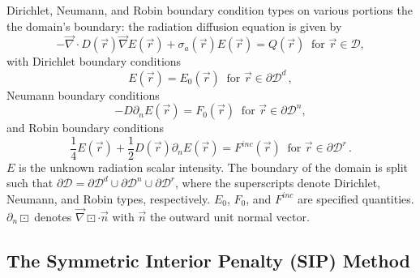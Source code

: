 \documentclass[preprint,10pt]{elsarticle}
\renewcommand{\div}{\vec{\nabla}\! \cdot \!}
\newcommand{\grad}{\vec{\nabla}}
\newcommand{\D}{\mathcal{D}}
\newcommand{\vr}{\vec{r}}
\newcommand{\vn}{\vec{n}}
\begin{document}
Dirichlet, Neumann, and Robin boundary condition types on various portions the the domain's
boundary: the radiation diffusion equation is given by
\begin{equation}
  -\div D(\vr) \grad E(\vr) + \sigma_a(\vr) E(\vr) = Q(\vr)\ \textrm{ for } \vr \in \D,
\end{equation}
with Dirichlet boundary conditions
\begin{equation}
  E(\vr)  = E_0(\vr)\ \textrm{ for } \vr \in  \partial \D^d \, ,
\end{equation}
Neumann boundary conditions
\begin{equation}
  -D \partial_n E(\vr) = F_0(\vr) \ \textrm{ for } \vr \in \partial \D^n,
\end{equation}
and Robin boundary conditions
\begin{equation}
  \frac{1}{4}E(\vr) + \frac{1}{2} D(\vr) \partial_n E(\vr) = F^{inc}(\vr) \ \textrm{ for } \vr \in  \partial \D^r \, .
\end{equation}
%
$E$ is the unknown radiation scalar intensity. The boundary of the domain is split such that
$\partial \D = \partial \D^d \cup \partial \D^n \cup \partial \D^r$,  where the superscripts
denote Dirichlet, Neumann, and Robin types, respectively. $E_0$, $F_0$, and $F^{inc}$ are specified
quantities. $\partial_n \boxdot$ denotes $ \grad \boxdot \cdot \vn$ with $\vn$ the outward unit normal vector.


\subsection{The Symmetric Interior Penalty (SIP) Method}
\end{document}
